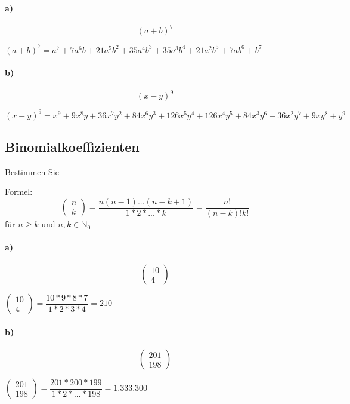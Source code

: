 \documentclass[paper=a4, fontsize=11pt]{scrartcl}
\numberwithin{equation}{section}
\numberwithin{figure}{section}
\numberwithin{table}{section}
\begin{document}
\paragraph{a)}
$$(a+b)^{7}$$

$(a+b)^{7}=a^{7}+7a^{6}b+21a^{5}b^{2}+35a^{4}b^{3}+35a^{3}b^{4}+21a^{2}b^{5}+7ab^{6}+b^{7}$
\paragraph{b)}
$$(x-y)^{9}$$

$(x-y)^{9}=x^{9}+9x^{8}y+36x^{7}y^{2}+84x^{6}y^{3}+126x^{5}y^{4}+126x^{4}y^{5}+84x^{3}y^{6}+36x^{2}y^{7}+9xy^{8}+y^{9}$
\subsection{Binomialkoeffizienten}
Bestimmen Sie

Formel: $$\left(\begin{array}{c} n \\ k \end{array}\right)
= \dfrac{n(n-1) ... (n-k+1)}{1*2*... *k}
= \dfrac{n!}{(n-k)!k!}$$ für $n \geq k$ und $n,k \in \mathbb{N}_{0}$

\paragraph{a)}
$$\left(\begin{array}{c} 10 \\ 4 \end{array}\right)$$

$\left(\begin{array}{c} 10 \\ 4 \end{array}\right) 
= \dfrac{10*9*8*7}{1*2*3*4}
= 210$
\paragraph{b)}
$$\left(\begin{array}{c} 201 \\ 198 \end{array}\right)$$

$\left(\begin{array}{c} 201 \\ 198 \end{array}\right) 
= \dfrac{201*200*199}{1*2* ... * 198}
= 1.333.300$
\end{document}
